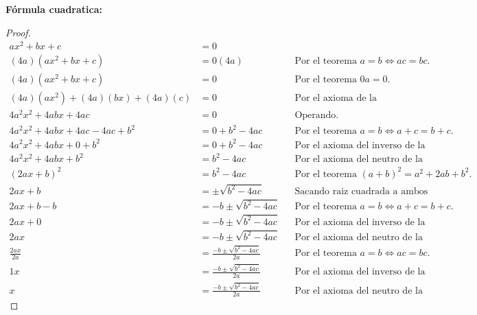 \documentclass[12pt]{article}
\begin{document}
\vfill

\textbf{F\'ormula cuadratica:}
\begin{proof}
\begin{align*}
    ax^2+bx+c&=0\\
    (4a)(ax^2+bx+c)&=0(4a) \quad &&\text{Por el teorema $a=b \iff ac=bc$.}\\
    (4a)(ax^2+bx+c)&=0 &&\text{Por el teorema $0a=0$.}\\
    (4a)(ax^2)+(4a)(bx)+(4a)(c)&=0 &&\text{Por el axioma de la distributividad.}\\
    4a^2x^2+4abx+4ac&=0 &&\text{Operando.}\\
    4a^2x^2+4abx+4ac-4ac+b^2&=0+b^2-4ac &&\text{Por el teorema $a=b \iff a+c=b+c$.}\\
    4a^2x^2+4abx+0+b^2&=0+b^2-4ac &&\text{Por el axioma del inverso de la suma.}\\
    4a^2x^2+4abx+b^2&=b^2-4ac &&\text{Por el axioma del neutro de la suma.}\\
    (2ax+b)^2&=b^2-4ac &&\text{Por el teorema $(a+b)^2=a^2+2ab+b^2$.}\\
    2ax+b&=\pm \sqrt{b^2-4ac} &&\text{Sacando raiz cuadrada a ambos lados.}\\
    2ax+b-b&=-b \pm \sqrt{b^2-4ac} &&\text{Por el teorema $a=b \iff a+c=b+c$.}\\
    2ax+0&=-b \pm \sqrt{b^2-4ac} &&\text{Por el axioma del inverso de la suma.}\\
    2ax&=-b \pm \sqrt{b^2-4ac} &&\text{Por el axioma del neutro de la suma.}\\
    \frac{2ax}{2a}&=\frac{-b\pm \sqrt{b^2-4ac}}{2a} &&\text{Por el teorema $a=b \iff ac=bc$.}\\
    1x&=\frac{-b\pm \sqrt{b^2-4ac}}{2a} &&\text{Por el axioma del inverso de la multiplicación.}\\
    x&=\frac{-b\pm \sqrt{b^2-4ac}}{2a} &&\text{Por el axioma del neutro de la multiplicación.}
\end{align*}
\end{proof}
\end{document}
